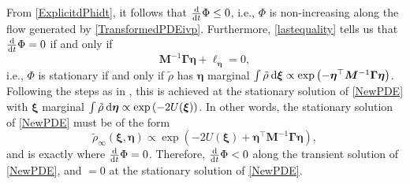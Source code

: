 \documentclass[10pt,twocolumn]{IEEEtran}
\newcommand{\differential}{{\rm{d}}}
\begin{document}
From \eqref{ExplicitdPhidt}, it follows that $\frac{\differential}{\differential t}\Phi \leq 0$, i.e., $\Phi$ is non-increasing along the flow generated by \eqref{TransformedPDEivp}. Furthermore, \eqref{lastequality} tells us that $\frac{\differential}{\differential t}\Phi = 0$ if and only if 
$$\bm{M}^{-1}\bm{\Gamma}\bm{\eta} + \bm{\ell}_{\bm{\eta}} = 0,$$
i.e., $\Phi$ is stationary if and only if $\tilde{\rho}$ has $\bm{\eta}$ marginal $\int\tilde{\rho}\:\differential\bm{\xi} \propto \exp\left(-\bm{\eta}^{\top}\bm{M}^{-1}\bm{\Gamma}\bm{\eta}\right)$. Following the steps as in \cite[Appendix E.1]{krichene2020global}, this is achieved at the stationary solution of \eqref{NewPDE} with $\bm{\xi}$ marginal $\int\tilde{\rho}\:\differential\bm{\eta} \propto \exp\left(-2U(\bm{\xi})\right)$. In other words, the stationary solution of \eqref{NewPDE} must be of the form 
$$\tilde{\rho}_{\infty}(\bm{\xi},\bm{\eta}) \propto \exp\left(-2U(\bm{\xi})+\bm{\eta}^{\top}\bm{M}^{-1}\bm{\Gamma}\bm{\eta}\right),$$
and is exactly where $\frac{\differential}{\differential t}\Phi = 0$. Therefore, $\frac{\differential}{\differential t}\Phi < 0$ along the transient solution of \eqref{NewPDE}, and $=0$ at the stationary solution of \eqref{NewPDE}.














\end{document}
